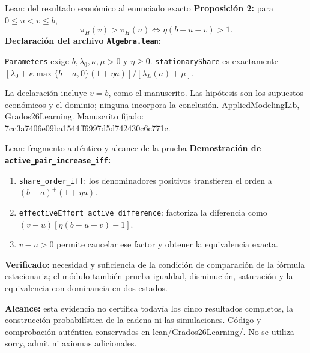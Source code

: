 \documentclass[aspectratio=169,11pt]{beamer}
\newcommand{\source}[1]{\vfill{\tiny\color{black!60}#1}}
\newcommand{\lam}{\lambda_L}
\begin{document}
\begin{frame}[fragile]{Lean: del resultado económico al enunciado exacto}
  \textbf{Proposición 2:} para $0\leq u<v\leq b$,
  \[
    \pi_H(v)>\pi_H(u)\iff\eta(b-u-v)>1.
  \]
  \textbf{Declaración del archivo \texttt{Algebra.lean}:}
  
  \medskip
  \small \texttt{Parameters} exige $b,\lambda_0,\kappa,\mu>0$ y $\eta\geq0$.
  \texttt{stationaryShare} es exactamente
  $[\lambda_0+\kappa\max\{b-a,0\}(1+\eta a)]/[\lam(a)+\mu]$.
  \par\medskip
  La declaración incluye $v=b$, como el manuscrito. Las hipótesis son
  los supuestos económicos y el dominio; ninguna incorpora la conclusión.
  \source{AppliedModelingLib, Grados26Learning. Manuscrito fijado: 7cc3a7406e09ba1544ff6997d5d742430c6c771c.}
\end{frame}

\begin{frame}[fragile]{Lean: fragmento auténtico y alcance de la prueba}
  \textbf{Demostración de \texttt{active\_pair\_increase\_iff}:}
  
  \medskip
  \begin{enumerate}\small
    \item \texttt{share\_order\_iff}: los denominadores positivos transfieren
    el orden a $(b-a)^+(1+\eta a)$.
    \item \texttt{effectiveEffort\_active\_difference}: factoriza la diferencia
    como $(v-u)[\eta(b-u-v)-1]$.
    \item $v-u>0$ permite cancelar ese factor y obtener la equivalencia exacta.
  \end{enumerate}
  \medskip
  \small \textbf{Verificado:} necesidad y suficiencia de la condición de comparación
  de la fórmula estacionaria; el módulo también prueba igualdad, disminución,
  saturación y la equivalencia con dominancia en dos estados.
  \par\smallskip
  \textbf{Alcance:} esta evidencia no certifica todavía los cinco resultados completos,
  la construcción probabilística de la cadena ni las simulaciones.
  \source{Código y comprobación auténtica conservados en lean/Grados26Learning/.
  No se utiliza sorry, admit ni axiomas adicionales.}
\end{frame}
\end{document}
